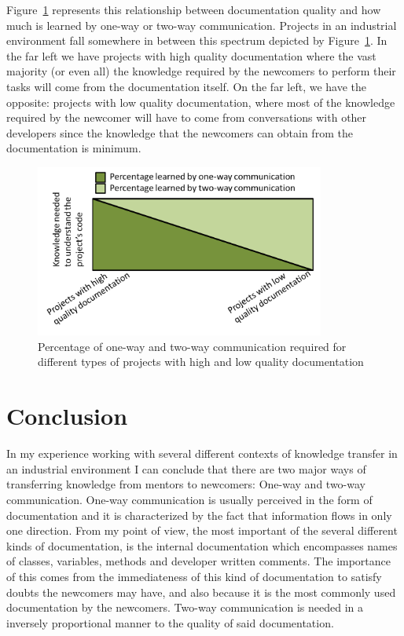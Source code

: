 \documentclass[12pt, letterpaper]{article}
\begin{document}
Figure~\ref{graph1} represents this relationship between documentation quality and how much is learned by
one-way or two-way communication. Projects in an industrial environment fall somewhere in between this spectrum 
depicted by Figure~\ref{graph1}. In the far left we have projects with high quality documentation where the vast
majority (or even all) the knowledge required by the newcomers to perform their tasks will come from the 
documentation itself. On the far left, we have the opposite: projects with low quality documentation, where most 
of the knowledge required by the newcomer will have to come from conversations with other developers since
the knowledge that the newcomers can obtain from the documentation is minimum.


\begin{figure}[h]
    \centering
    \includegraphics[width=0.85\textwidth]{Graph1}
    \caption{Percentage of one-way and two-way communication required for different types of projects with high and low quality documentation}
    \label{graph1}
\end{figure}






\section{Conclusion}

In my experience working with several different contexts of knowledge transfer in an industrial environment
I can conclude that there are two major ways of transferring knowledge from mentors to newcomers: One-way
and two-way communication. One-way communication is usually perceived in the form of documentation and it 
is characterized by the fact that information flows in only one direction. From my point of view, the most 
important of the several different kinds of documentation, is the internal documentation which encompasses
names of classes, variables, methods and developer written comments. The importance of this comes from
the immediateness of this kind of documentation to satisfy doubts the newcomers may have, and also because
it is the most commonly used documentation by the newcomers. Two-way communication is needed in a inversely 
proportional manner to the quality of said documentation.
\end{document}
